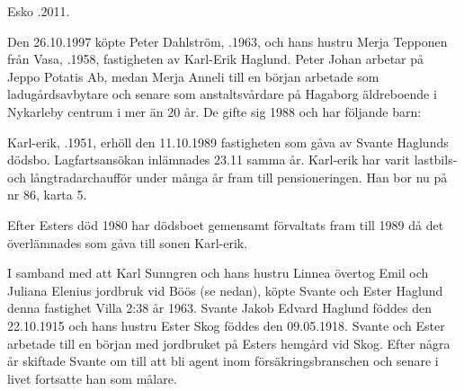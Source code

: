 Esko .2011.





Den 26.10.1997 köpte Peter Dahlström, .1963, och hans hustru Merja Tepponen från Vasa, .1958, fastigheten av Karl-Erik Haglund. Peter Johan arbetar på Jeppo Potatis Ab, medan Merja Anneli till en början arbetade som ladugårdsavbytare och senare som anstaltsvårdare på Hagaborg äldreboende i Nykarleby centrum i mer än 20 år. De gifte sig 1988 och har följande barn:
\begin{jhchildren}
  \item {}
  \item {}
  \item {}
  \item {}
  \item {}
\end{jhchildren}


Karl-erik, .1951, erhöll den 11.10.1989 fastigheten som gåva av Svante Haglunds dödsbo. Lagfartsansökan inlämnades 23.11 samma år. Karl-erik har varit lastbils- och långtradarchaufför under många år fram till pensioneringen. Han bor nu på nr 86, karta 5.


Efter Esters död 1980 har dödsboet gemensamt förvaltats fram till 1989 då det överlämnades som gåva till sonen Karl-erik.\jhvspace{}


I samband med att Karl Sunngren och hans hustru Linnea övertog Emil och Juliana Elenius jordbruk vid Böös (se nedan), köpte Svante och Ester Haglund denna fastighet Villa 2:38 år 1963. Svante Jakob Edvard Haglund föddes den 22.10.1915 och hans hustru Ester Skog föddes den 09.05.1918. Svante och Ester arbetade till en början med jordbruket på Esters hemgård vid Skog. Efter några år skiftade Svante om till att bli agent inom försäkringsbranschen och senare i livet fortsatte han som målare.
\begin{jhchildren}
  \item {}
  \item {}
  \item {}
  \item {}
  \item {}
\end{jhchildren}

